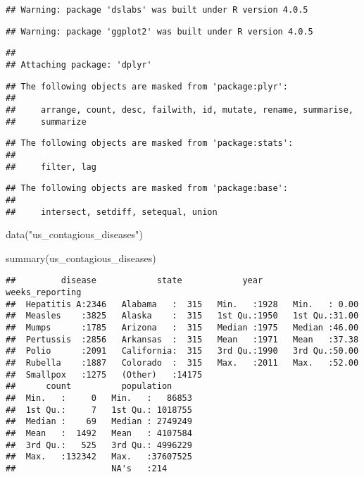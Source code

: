\documentclass[
]{article}
\newenvironment{Shaded}{\begin{snugshade}}{\end{snugshade}}
\newcommand{\FunctionTok}[1]{\textcolor[rgb]{0.00,0.00,0.00}{#1}}
\newcommand{\NormalTok}[1]{#1}
\newcommand{\StringTok}[1]{\textcolor[rgb]{0.31,0.60,0.02}{#1}}
\begin{document}
\begin{verbatim}
## Warning: package 'dslabs' was built under R version 4.0.5
\end{verbatim}

\begin{verbatim}
## Warning: package 'ggplot2' was built under R version 4.0.5
\end{verbatim}

\begin{verbatim}
## 
## Attaching package: 'dplyr'
\end{verbatim}

\begin{verbatim}
## The following objects are masked from 'package:plyr':
## 
##     arrange, count, desc, failwith, id, mutate, rename, summarise,
##     summarize
\end{verbatim}

\begin{verbatim}
## The following objects are masked from 'package:stats':
## 
##     filter, lag
\end{verbatim}

\begin{verbatim}
## The following objects are masked from 'package:base':
## 
##     intersect, setdiff, setequal, union
\end{verbatim}

\begin{Shaded}
\begin{Highlighting}[]
\FunctionTok{data}\NormalTok{(}\StringTok{"us\_contagious\_diseases"}\NormalTok{)}
\end{Highlighting}
\end{Shaded}

\begin{Shaded}
\begin{Highlighting}[]
\FunctionTok{summary}\NormalTok{(us\_contagious\_diseases)}
\end{Highlighting}
\end{Shaded}

\begin{verbatim}
##         disease            state            year      weeks_reporting
##  Hepatitis A:2346   Alabama   :  315   Min.   :1928   Min.   : 0.00  
##  Measles    :3825   Alaska    :  315   1st Qu.:1950   1st Qu.:31.00  
##  Mumps      :1785   Arizona   :  315   Median :1975   Median :46.00  
##  Pertussis  :2856   Arkansas  :  315   Mean   :1971   Mean   :37.38  
##  Polio      :2091   California:  315   3rd Qu.:1990   3rd Qu.:50.00  
##  Rubella    :1887   Colorado  :  315   Max.   :2011   Max.   :52.00  
##  Smallpox   :1275   (Other)   :14175                                 
##      count          population      
##  Min.   :     0   Min.   :   86853  
##  1st Qu.:     7   1st Qu.: 1018755  
##  Median :    69   Median : 2749249  
##  Mean   :  1492   Mean   : 4107584  
##  3rd Qu.:   525   3rd Qu.: 4996229  
##  Max.   :132342   Max.   :37607525  
##                   NA's   :214
\end{verbatim}
\end{document}
